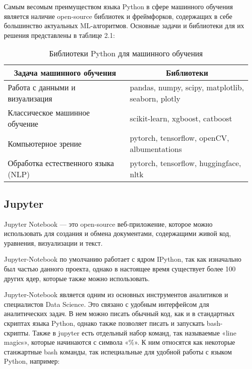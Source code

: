 Самым весомым преимуществом языка Python в сфере машинного обучения является наличие open-source библиотек и фреймфорков, содержащих в себе большинство актуальных ML-алгоритмов. Основные задачи и библиотеки для их решения представлены в таблице 2.1:

\begin{table}[ht]
	\caption{Библиотеки Python для машинного обучения}
	\label{table:tech:ml_libs}
	\centering
	\begin{tabular}{|p{0.5\linewidth}|p{0.5\linewidth}|}
		\hline
		\multicolumn{1}{|c|}{Задача машинного обучения} & \multicolumn{1}{|c|}{Библиотеки} \\
		\hline
		Работа с данными и визуализация & pandas, numpy, scipy, matplotlib, seaborn, plotly \\
		\hline
		Классическое машинное обучение & scikit-learn, xgboost, catboost \\
		\hline
		Компьютерное зрение & pytorch, tensorflow, openCV, albumentations \\
		\hline
		Обработка естественного языка (NLP) & pytorch, tensorflow, huggingface, nltk \\
		\hline
	\end{tabular}
\end{table}


\subsection{Jupyter}

Jupyter Notebook --- это open-source веб-приложение, которое можно использовать для создания и обмена документами, содержащими живой код, уравнения, визуализации и текст.

Jupyter-Notebook по умолчанию работает с ядром IPython, так как изначально был частью данного проекта, однако в настоящее время существует более 100 других ядер, которые также можно использовать.

Jupyter-Notebook является одним из основных инструментов аналитиков и специалистов Data Science. Это связано с удобным интерфейсом для аналитических задач. В нем можно писать обычный код, как и в стандартных скриптах языка Python, однако также позволяет писать и запускать bash-скрипты. Также в jupyter есть отдельный набор команд, так называемые «line magics», которые начинаются с символа «\%». К ним относятся как некоторые станжартные bash команды, так испециальные для удобной работы с языком Python, например:

